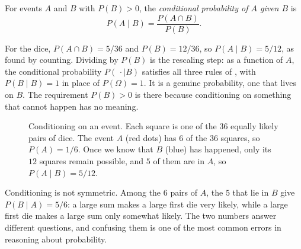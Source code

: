 \begin{definition}
  \label{def:conditional}
  For events $A$ and $B$ with $P(B) > 0$, the \emph{conditional
  probability of $A$ given $B$} is
  \[
    P(A \mid B) = \frac{P(A \cap B)}{P(B)} .
  \]
\end{definition}

For the dice, $P(A \cap B) = 5/36$ and $P(B) = 12/36$, so $P(A \mid B) =
5/12$, as found by counting. Dividing by $P(B)$ is the rescaling step:
as a function of $A$, the conditional probability $P(\,\cdot \mid B)$
satisfies all three rules of , with $P(B \mid B) =
1$ in place of $P(\Omega) = 1$. It is a genuine probability, one that
lives on $B$. The requirement $P(B) > 0$ is there because conditioning
on something that cannot happen has no meaning.

\begin{figure}[ht]
  \centering
  \caption{Conditioning on an event. Each square is one of the $36$
    equally likely pairs of dice. The event $A$ (red dots) has $6$ of the
    $36$ squares, so $P(A) = 1/6$. Once we know that $B$ (blue) has
    happened, only its $12$ squares remain possible, and $5$ of them are
    in $A$, so $P(A \mid B) = 5/12$.}
  \label{fig:ch05-conditional}
\end{figure}

Conditioning is not symmetric. Among the $6$ pairs of $A$, the $5$ that
lie in $B$ give $P(B \mid A) = 5/6$: a large sum makes a large first die
very likely, while a large first die makes a large sum only somewhat
likely. The two numbers answer different questions, and confusing them
is one of the most common errors in reasoning about probability.

